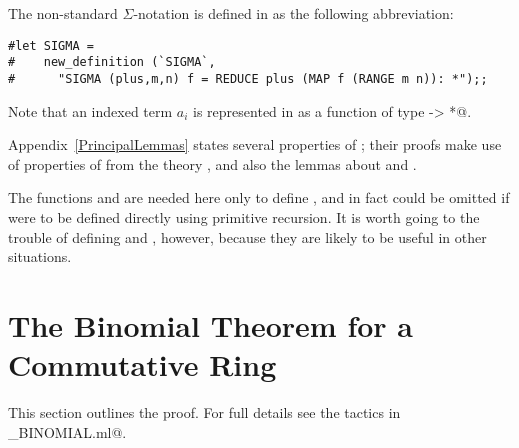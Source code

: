 The non-standard $\Sigma$-notation is defined in \HOL{} as the following
abbreviation:
\begin{session}
\begin{verbatim}
#let SIGMA =
#    new_definition (`SIGMA`,
#      "SIGMA (plus,m,n) f = REDUCE plus (MAP f (RANGE m n)): *");;
\end{verbatim}
\end{session}
Note that an indexed term $a_i$ is represented in \HOL{} as a function
\verb@f@ of type \verb@num -> *@.

Appendix~\ref{PrincipalLemmas} states several properties of \verb@SIGMA@;
their proofs make use of properties of \verb@MAP@ from the theory
\verb@list@, and also the lemmas about \verb@REDUCE@ and \verb@RANGE@.

The functions \verb@REDUCE@ and \verb@RANGE@ are needed here only to define
\verb@SIGMA@, and in fact could be omitted if \verb@SIGMA@ were to be defined
directly  using primitive recursion.  It is worth going to the trouble
of defining \verb@REDUCE@ and \verb@RANGE@, however, because they are likely
to be useful in other situations.


\section{The Binomial Theorem for a Commutative Ring}
\label{BinomialTheorem}

This section outlines the proof.  For full details see the tactics in
\verb@mk_BINOMIAL.ml@.

